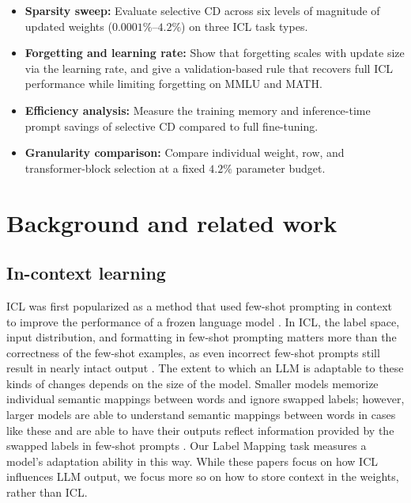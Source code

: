 \documentclass{article} %
\newcommand{\todo}[1]{{\color{red}[TODO: #1]}}
\begin{document}
\begin{itemize}
    \item \textbf{Sparsity sweep:} Evaluate selective CD across six levels of magnitude of updated weights ($0.0001\%$--$4.2\%$) on three ICL task types.
    \item \textbf{Forgetting and learning rate:} Show that forgetting scales with update size via the learning rate, and give a validation-based rule that recovers full ICL performance while limiting forgetting on MMLU and MATH.
    \item \textbf{Efficiency analysis:} Measure the training memory and inference-time prompt savings of selective CD compared to full fine-tuning.
    \item \textbf{Granularity comparison:} Compare individual weight, row, and transformer-block selection at a fixed $4.2\%$ parameter budget.
\end{itemize}

\section{Background and related work}
\label{sec:related}

\subsection{In-context learning}

ICL was first popularized as a method that used few-shot prompting in context to improve the performance of a frozen language model \citep{brown2020language}. In ICL, the label space, input distribution, and formatting in few-shot prompting matters more than the correctness of the few-shot examples, as even incorrect few-shot prompts still result in nearly intact output \citep{min2022rethinking}. The extent to which an LLM is adaptable to these kinds of changes depends on the size of the model. Smaller models memorize individual semantic mappings between words and ignore swapped labels; however, larger models are able to understand semantic mappings between words in cases like these and are able to have their outputs reflect information provided by the swapped labels in few-shot prompts \citep{wei2023larger}. Our Label Mapping task measures a model's adaptation ability in this way. While these papers focus on how ICL influences LLM output, we focus more so on how to store context in the weights, rather than ICL.
\end{document}
